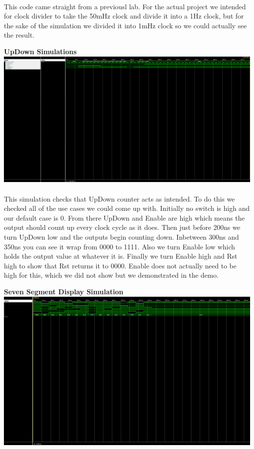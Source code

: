 \documentclass[12pt]{report}
\begin{document}
			\paragraph*{}
				This code came straight from a previousl lab.  For the actual project we 
				intended for clock divider to take the 50mHz clock and divide it into a 1Hz 
				clock, but for the sake of the simulation we divided it into 1mHz clock so we 
				could actually see the result.
		\vspace{10cm}
		\begin{center}
			\textbf{UpDown Simulations}
			\includegraphics[scale=.28]{tb_2.PNG}
		\end{center}
			\paragraph*{}
				This simulation checks that UpDown counter acts as intended.  To do this we 
				checked all of the use cases we could come up with.  Initially no switch is
				high and our default case is 0.  From there UpDown and Enable are high which
				means the output should count up every clock cycle as it does.  Then just before 
				200ns we turn UpDown low and the outputs begin counting down.  Inbetween 300ns 
				and 350ns you can see it wrap from 0000 to 1111.  Also we turn Enable low which
				holds the output value at whatever it is.  Finally we turn Enable high and Rst 
				high to show that Rst returns it to 0000.  Enable does not actually need to be 
				high for this, which we did not show but we demonstrated in the demo.
		\vspace{10cm}
		\begin{center}
			\textbf{Seven Segment Display Simulation}
			\includegraphics[scale=.3295]{tb_3.PNG}
		\end{center}
\end{document}
